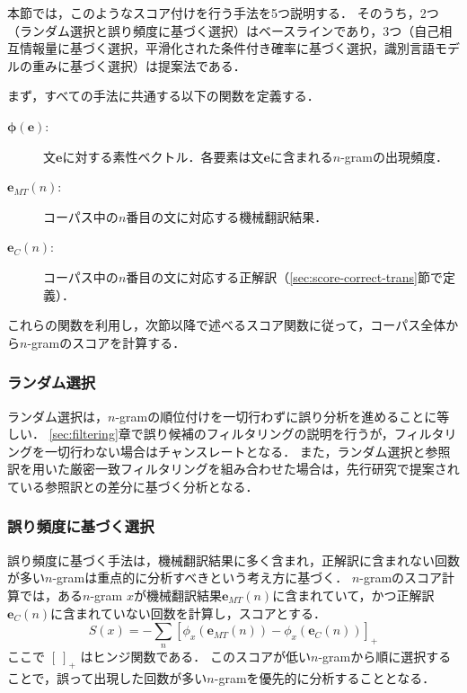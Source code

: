 \documentclass[japanese]{jnlp_1.4}
\begin{document}
本節では，このようなスコア付けを行う手法を5つ説明する．
そのうち，2つ（ランダム選択と誤り頻度に基づく選択）はベースラインであり，3つ（自己相互情報量に基づく選択，平滑化された条件付き確率に基づく選択，識別言語モデルの重みに基づく選択）は提案法である．

まず，すべての手法に共通する以下の関数を定義する．
\begin{description}
	\item[$\boldsymbol{\phi}(\boldsymbol{e})$:] 文$\boldsymbol{e}$に対する素性ベクトル．各要素は文$\boldsymbol{e}$に含まれる$n$-gramの出現頻度．
	\item[$\boldsymbol{e}_{MT}(n)$:] コーパス中の$n$番目の文に対応する機械翻訳結果．
	\item[$\boldsymbol{e}_{C}(n)$:] コーパス中の$n$番目の文に対応する正解訳（\ref{sec:score-correct-trans}節で定義）．
\end{description}

これらの関数を利用し，次節以降で述べるスコア関数に従って，コーパス全体から$n$-gramのスコアを計算する．


\subsubsection{ランダム選択}

ランダム選択は，$n$-gramの順位付けを一切行わずに誤り分析を進めることに等しい．
\ref{sec:filtering}章で誤り候補のフィルタリングの説明を行うが，フィルタリングを一切行わない場合はチャンスレートとなる．
また，ランダム選択と参照訳を用いた厳密一致フィルタリングを組み合わせた場合は，先行研究\cite{popovic2011towards}で提案されている参照訳との差分に基づく分析となる．


\subsubsection{誤り頻度に基づく選択}

誤り頻度に基づく手法は，機械翻訳結果に多く含まれ，正解訳に含まれない回数が多い$n$-gramは重点的に分析すべきという考え方に基づく．
$n$-gramのスコア計算では，ある$n$-gram $x$が機械翻訳結果$\boldsymbol{e}_{MT}(n)$に含まれていて，かつ正解訳$\boldsymbol{e}_{C}(n)$に含まれていない回数を計算し，スコアとする．
\begin{equation}
S(x) = -\sum_n \left [ \phi_x(\boldsymbol{e}_{MT}(n)) - \phi_x(\boldsymbol{e}_{C}(n)) \right ]_+ 
\label{eqn:freq}
\end{equation}
ここで $[ ~ ]_+$ はヒンジ関数である．
このスコアが低い$n$-gramから順に選択することで，誤って出現した回数が多い$n$-gramを優先的に分析することとなる．
\end{document}

